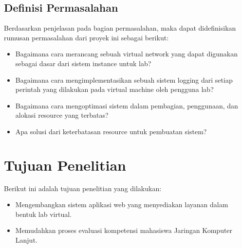 \subsection{Definisi Permasalahan}
\label{sec:definisiMasalah}
Berdasarkan penjelasan pada bagian permasalahan, maka dapat didefinisikan rumusan permasalahan dari proyek ini sebagai berikut:
\begin{itemize}
	\item Bagaimana cara merancang sebuah virtual network yang dapat digunakan sebagai dasar dari sistem instance untuk lab?
	\item Bagaimana cara mengimplementasikan sebuah sistem logging dari setiap perintah yang dilakukan pada virtual machine oleh pengguna lab?
	\item Bagaimana cara mengoptimasi sistem dalam pembagian, penggunaan, dan alokasi resource yang terbatas?
	\item Apa solusi dari keterbatasan resource untuk pembuatan sistem?
\end{itemize}



\section{Tujuan Penelitian}
\label{sec:tujuan}
Berikut ini adalah tujuan penelitian yang dilakukan:
\begin{itemize}
	\item Mengembangkan sistem aplikasi web yang menyediakan layanan dalam bentuk lab virtual.
	\item Memudahkan proses evaluasi kompetensi mahasiswa Jaringan Komputer Lanjut.
\end{itemize}


